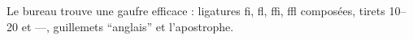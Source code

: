 \documentclass{article}
\begin{document}
\hsize=380pt
\noindent Le bureau trouve une gaufre efficace : ligatures fi, fl, ffi, ffl compos\'ees, tirets 10--20 et ---, guillemets ``anglais'' et l'apostrophe.
\end{document}
